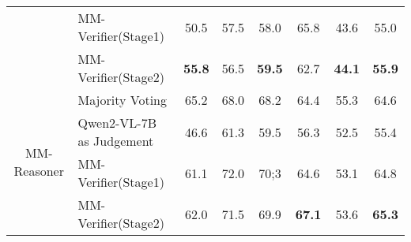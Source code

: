 \begin{table*}[htbp]
{\begin{tabular}{cl|c|c|c|c|c|c}
          & MM-Verifier(Stage1) & 50.5  & 57.5  & 58.0  & 65.8  & 43.6  & 55.0 \\
          & MM-Verifier(Stage2) & \textbf{55.8}  & 56.5  & \textbf{59.5}  & 62.7  & \textbf{44.1}  & \textbf{55.9} \\
    \midrule
    \multirow{4}[2]{*}{MM-Reasoner} & Majority Voting & 65.2  & 68.0  & 68.2  & 64.4  & 55.3  & 64.6 \\
          & Qwen2-VL-7B as Judgement & 46.6  & 61.3  & 59.5  & 56.3  & 52.5  & 55.4 \\
          & MM-Verifier(Stage1) & 61.1  & 72.0  & 70;3  & 64.6  & 53.1  & 64.8 \\
          & MM-Verifier(Stage2) & 62.0  & 71.5  & 69.9  & \textbf{67.1}  & 53.6  & \textbf{65.3} \\
    \bottomrule
    \end{tabular}%
    }
  \label{tab:appendix_vista}%
\end{table*}%
